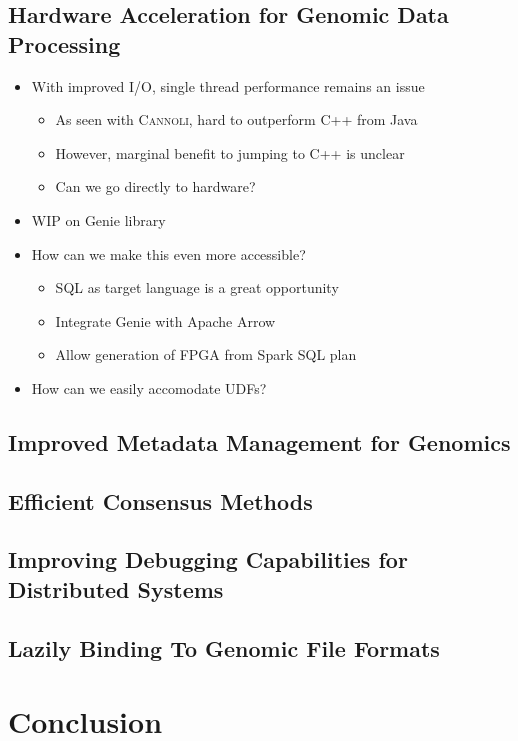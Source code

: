 \documentclass[phd]{ucbthesis}
\begin{document}
\section{Hardware Acceleration for Genomic Data Processing}
\label{sec:genomic-hardware}

\begin{itemize}
\item With improved I/O, single thread performance remains an issue
  \begin{itemize}
  \item As seen with \textsc{Cannoli}, hard to outperform C++ from Java
  \item However, marginal benefit to jumping to C++ is unclear
  \item Can we go directly to hardware?
  \end{itemize}
\item WIP on Genie library
\item How can we make this even more accessible?
  \begin{itemize}
  \item SQL as target language is a great opportunity
  \item Integrate Genie with Apache Arrow
  \item Allow generation of FPGA from Spark SQL plan
  \end{itemize}
\item How can we easily accomodate UDFs?
\end{itemize}

\section{Improved Metadata Management for Genomics}
\label{sec:metadata-future}

\section{Efficient Consensus Methods}
\label{sec:efficient-consensus}

\section{Improving Debugging Capabilities for Distributed Systems}
\label{sec:improving-debug}

\section{Lazily Binding To Genomic File Formats}
\label{sec:lazy-bind}

\chapter{Conclusion}
\label{chap:conclusion}

\backmatter



\end{document}
